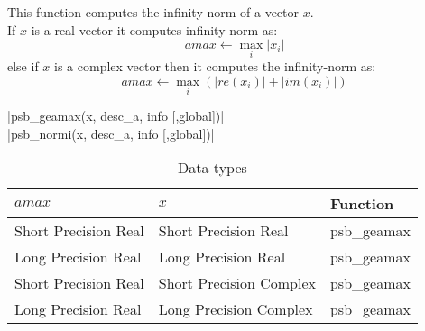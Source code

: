 This function computes
 the infinity-norm of a vector $x$.\\
If $x$ is a real  vector
it computes infinity norm as:
\[ amax \leftarrow \max_i |x_i|\]
else if $x$ is a complex vector then it computes the infinity-norm  as:
\[ amax \leftarrow \max_i {(|re(x_i)| + |im(x_i)|)}\]

\fortinline|psb_geamax(x, desc_a, info [,global])|\\
\fortinline|psb_normi(x, desc_a, info [,global])|

\begin{table}[h]
\begin{center}
\begin{tabular}{lll}
\hline
$amax$ & $x$ & {\bf Function}\\
\hline
Short Precision Real& Short Precision Real & psb\_geamax \\
Long Precision Real&Long Precision Real & psb\_geamax \\
Short Precision Real&Short Precision Complex & psb\_geamax \\
Long Precision Real&Long Precision Complex & psb\_geamax \\
\hline
\end{tabular}
\end{center}
\caption{Data types\label{tab:f90amax}}
\end{table}


